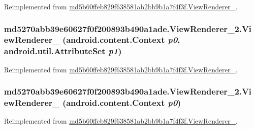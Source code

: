 Reimplemented from \hyperlink{classmd5b60ffeb829f638581ab2bb9b1a7f4f3f_1_1_view_renderer__2_a98f61b833d11b90b0f77280606f4d3a}{md5b60ffeb829f638581ab2bb9b1a7f4f3f.ViewRenderer\_}.\hypertarget{classmd5270abb39e60627f0f200893b490a1ade_1_1_view_renderer__2_0295102267caddfc524759e82d0f5b04}{
\subsubsection[{ViewRenderer\_\-2}]{\setlength{\rightskip}{0pt plus 5cm}md5270abb39e60627f0f200893b490a1ade.ViewRenderer\_\-2.ViewRenderer\_ (android.content.Context {\em p0}, \/  android.util.AttributeSet {\em p1})}}
\label{classmd5270abb39e60627f0f200893b490a1ade_1_1_view_renderer__2_0295102267caddfc524759e82d0f5b04}




Reimplemented from \hyperlink{classmd5b60ffeb829f638581ab2bb9b1a7f4f3f_1_1_view_renderer__2_c966f9a1a233932f6db02bda0d1474f0}{md5b60ffeb829f638581ab2bb9b1a7f4f3f.ViewRenderer\_}.\hypertarget{classmd5270abb39e60627f0f200893b490a1ade_1_1_view_renderer__2_7f4b9d7dd89bbae2b8dd2f6c799e4c02}{
\subsubsection[{ViewRenderer\_\-2}]{\setlength{\rightskip}{0pt plus 5cm}md5270abb39e60627f0f200893b490a1ade.ViewRenderer\_\-2.ViewRenderer\_ (android.content.Context {\em p0})}}
\label{classmd5270abb39e60627f0f200893b490a1ade_1_1_view_renderer__2_7f4b9d7dd89bbae2b8dd2f6c799e4c02}




Reimplemented from \hyperlink{classmd5b60ffeb829f638581ab2bb9b1a7f4f3f_1_1_view_renderer__2_afcf92f11bfe726fa3c914d9aa18b1a4}{md5b60ffeb829f638581ab2bb9b1a7f4f3f.ViewRenderer\_}.

